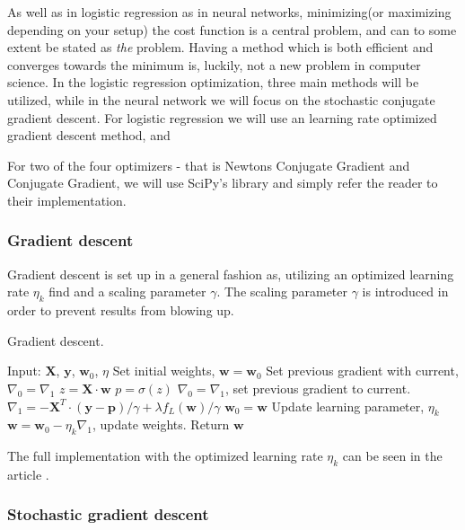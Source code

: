 As well as in logistic regression as in neural networks, minimizing(or maximizing depending on your setup) the cost function is a central problem, and can to some extent be stated as \textit{the} problem. Having a method which is both efficient and converges towards the minimum is, luckily, not a new problem in computer science. In the logistic regression optimization, three main methods will be utilized, while in the neural network we will focus on the stochastic conjugate gradient descent. For logistic regression we will use an learning rate optimized gradient descent method, and 

For two of the four optimizers - that is Newtons Conjugate Gradient\cite{} and Conjugate Gradient\cite{Press:2007:NRE:1403886}, we will use SciPy's library\cite{scipy} and simply refer the reader to their implementation.

\subsubsection{Gradient descent}
Gradient descent is set up in a general fashion as, utilizing an optimized learning rate $\eta_k$ find and a scaling parameter $\gamma$. The scaling parameter $\gamma$ is introduced in order to prevent results from blowing up.
\begin{algorithm}[H]
    \caption{Gradient descent.}
    \label{alg:gd}
    \begin{algorithmic}[1]
        \State Input: $\bm{X}$, $\bm{y}$, $\bm{w}_0$, $\eta$
        \State Set initial weights, $\bm{w} = \bm{w}_0$
        \State Set previous gradient with current, $\nabla_0 = \nabla_1$
            \State $z = \bm{X}\cdot \bm{w}$
            \State $p = \sigma(z)$
            \State $\nabla_0 = \nabla_1$, set previous gradient to current.
            \State $\nabla_1 = - \bm{X}^T \cdot (\bm{y} - \bm{p}) / \gamma + \lambda f_L(\bm{w}) / \gamma$
            \State $\bm{w}_0 = \bm{w}$
            \State Update learning parameter, $\eta_k$
            \State $\bm{w} = \bm{w}_0 - \eta_k \nabla_1$, update weights.
        \EndWhile
        \State Return $\bm{w}$
    \end{algorithmic}
\end{algorithm}
The full implementation with the optimized learning rate $\eta_k$ can be seen in the article \citet{optimal-learning-rate}.

\subsubsection{Stochastic gradient descent}


